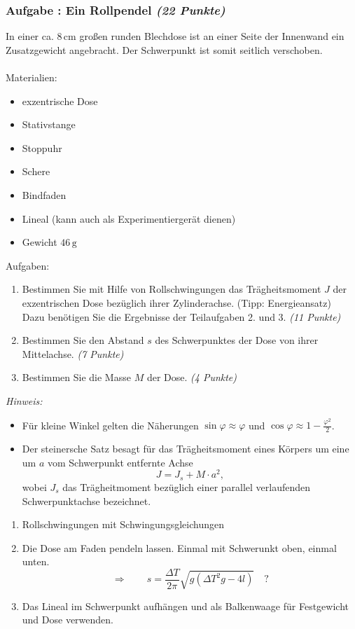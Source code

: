 \documentclass[12pt,a4paper]{article}
\newcommand{\unit}[1]{\,\mathrm{#1}}
\newcommand{\hinweis}{\emph{Hinweis:} }
\newenvironment{abcenum}{\renewcommand{\labelenumi}{(\alph{enumi})} \begin{enumerate}}{\end{enumerate}\renewcommand{\labelenumi}{\theenumi .}}
\newcounter{numlabel}
\newenvironment{problem}[2]{\stepcounter{numlabel} \vspace{1ex} \subsubsection*{Aufgabe \the\value{numlabel}: #1 \emph{(#2 Punkte)}} \renewcommand{\Currentlabel}{Aufgabe \the\value{numlabel}: #1}}{

}
\begin{document}
\begin{problem}{Ein Rollpendel}{22}
In einer ca. $8\unit{cm}$ großen runden Blechdose ist an einer Seite der Innenwand ein Zusatzgewicht angebracht. Der Schwerpunkt ist somit seitlich verschoben.\\
\\
Materialien:
\begin{itemize}
\item exzentrische Dose
\item Stativstange
\item Stoppuhr
\item Schere
\item Bindfaden
\item Lineal (kann auch als Experimentiergerät dienen)
\item Gewicht $46\unit{g}$
\end{itemize}
Aufgaben:
\begin{abcenum}
\item Bestimmen Sie mit Hilfe von Rollschwingungen das Trägheitsmoment $J$ der exzentrischen Dose bezüglich ihrer Zylinderachse. (Tipp: Energieansatz)\\
Dazu benötigen Sie die Ergebnisse der Teilaufgaben 2. und 3. \emph{(11 Punkte)}
\item Bestimmen Sie den Abstand $s$ des Schwerpunktes der Dose von ihrer Mittelachse. \emph{(7 Punkte)}
\item Bestimmen Sie die Masse $M$ der Dose. \emph{(4 Punkte)}
\end{abcenum}
\hinweis
\begin{itemize}
\item Für kleine Winkel gelten die Näherungen $\sin{\varphi}\approx\varphi$ und $\cos{\varphi}\approx1-\frac{\varphi^2}{2}$.
\item Der steinersche Satz besagt für das Trägheitsmoment eines Körpers um eine um $a$ vom Schwerpunkt entfernte Achse
\[
J=J_s+M\cdot a^2,
\]
wobei $J_s$ das Trägheitmoment bezüglich einer parallel verlaufenden Schwerpunktachse bezeichnet.
\end{itemize}
\begin{expsolution}
\begin{abcenum}
\item Rollschwingungen mit Schwingungsgleichungen
\item Die Dose am Faden pendeln lassen. Einmal mit Schwerunkt oben, einmal unten.
\[
\Rightarrow\qquad s=\frac{\Delta T}{2\pi}\sqrt{g\left(\Delta T^2g-4l\right)}\quad?
\]
\item Das Lineal im Schwerpunkt aufhängen und als Balkenwaage für Festgewicht und Dose verwenden.
\end{abcenum}
\end{expsolution}
\end{problem}
\end{document}
